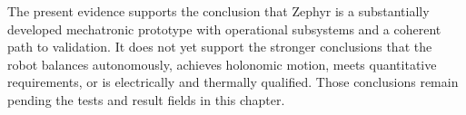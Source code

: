 The present evidence supports the conclusion that Zephyr is a
substantially developed mechatronic prototype with operational
subsystems and a coherent path to validation. It does not yet support
the stronger conclusions that the robot balances autonomously, achieves
holonomic motion, meets quantitative requirements, or is electrically
and thermally qualified. Those conclusions remain pending the tests and
result fields in this chapter.
